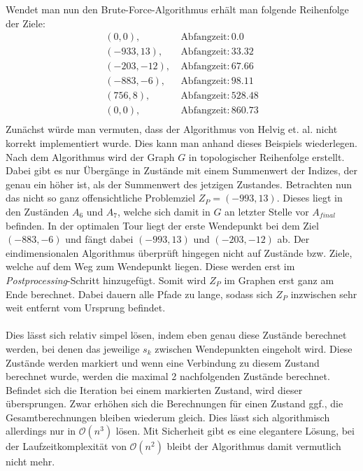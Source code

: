 \documentclass{scrartcl}
\begin{document}
Wendet man nun den Brute-Force-Algorithmus erhält man folgende Reihenfolge der Ziele:
\begin{align*}
(0, 0),~ &\text{Abfangzeit}: 0.0 \\
(-933, 13),~ &\text{Abfangzeit}: 33.32 \\
(-203, -12),~ &\text{Abfangzeit}: 67.66 \\
(-883, -6),~ &\text{Abfangzeit}: 98.11 \\
(756, 8),~ &\text{Abfangzeit}: 528.48 \\
(0, 0),~ &\text{Abfangzeit}: 860.73 \\
\end{align*}
Zunächst würde man vermuten, dass der Algorithmus von Helvig et. al. nicht korrekt implementiert wurde. Dies kann man anhand dieses Beispiels wiederlegen. \\
Nach dem Algorithmus wird der Graph $G$ in topologischer Reihenfolge erstellt. Dabei gibt es nur Übergänge in Zustände mit einem Summenwert der Indizes, der genau ein höher ist, als der Summenwert des jetzigen Zustandes. Betrachten nun das nicht so ganz offensichtliche Problemziel $Z_P=(-993, 13)$. Dieses liegt in den Zuständen $A_6$ und $A_7$, welche sich damit in $G$ an letzter Stelle vor $A_{final}$ befinden. In der optimalen Tour liegt der erste Wendepunkt bei dem Ziel $(-883, -6)$ und fängt dabei $(-993, 13)$ und $(-203,-12)$ ab. Der eindimensionalen Algorithmus überprüft hingegen nicht auf Zustände bzw. Ziele, welche auf dem Weg zum Wendepunkt liegen. Diese werden erst im \emph{Postprocessing}-Schritt hinzugefügt. Somit wird $Z_P$ im Graphen erst ganz am Ende berechnet. Dabei dauern alle Pfade zu lange, sodass sich $Z_P$ inzwischen sehr weit entfernt vom Ursprung befindet. \\\\
Dies lässt sich relativ simpel lösen, indem eben genau diese Zustände berechnet werden, bei denen das jeweilige $s_k$ zwischen Wendepunkten eingeholt wird. Diese Zustände werden markiert und wenn eine Verbindung zu diesem Zustand berechnet wurde, werden die maximal 2 nachfolgenden Zustände berechnet. Befindet sich die Iteration bei einem markierten Zustand, wird dieser übersprungen. Zwar erhöhen sich die Berechnungen für einen Zustand ggf., die Gesamtberechnungen bleiben wiederum gleich. Dies lässt sich algorithmisch allerdings nur in $\mathcal{O}(n^3)$ lösen. Mit Sicherheit gibt es eine elegantere Lösung, bei der Laufzeitkomplexität von $\mathcal{O}(n^2)$ bleibt der Algorithmus damit vermutlich nicht mehr.
\end{document}

